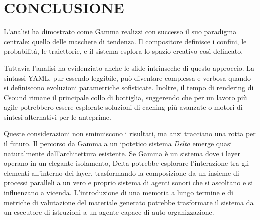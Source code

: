 
\section{CONCLUSIONE}
L'analisi ha dimostrato come Gamma realizzi con successo il suo paradigma centrale: quello delle maschere di tendenza. Il compositore definisce i confini, le probabilità, le traiettorie, e il sistema esplora lo spazio creativo così delineato.

Tuttavia l'analisi ha evidenziato anche le sfide intrinseche di questo approccio. La sintassi YAML, pur essendo leggibile, può diventare complessa e verbosa quando si definiscono evoluzioni parametriche sofisticate. Inoltre, il tempo di rendering di Csound rimane il principale collo di bottiglia, suggerendo che per un lavoro più agile potrebbero essere esplorate soluzioni di caching più avanzate o motori di sintesi alternativi per le anteprime.

Queste considerazioni non sminuiscono i risultati, ma anzi tracciano una rotta per il futuro. Il percorso da Gamma a un ipotetico sistema \textit{Delta} emerge quasi naturalmente dall'architettura esistente. Se Gamma è un sistema dove i layer operano in un elegante isolamento, Delta potrebbe esplorare l'interazione tra gli elementi all'interno dei layer, trasformando la composizione da un insieme di processi paralleli a un vero e proprio sistema di agenti sonori che si ascoltano e si influenzano a vicenda. L'introduzione di una memoria a lungo termine e di metriche di valutazione del materiale generato potrebbe trasformare il sistema da un esecutore di istruzioni a un agente capace di auto-organizzazione.